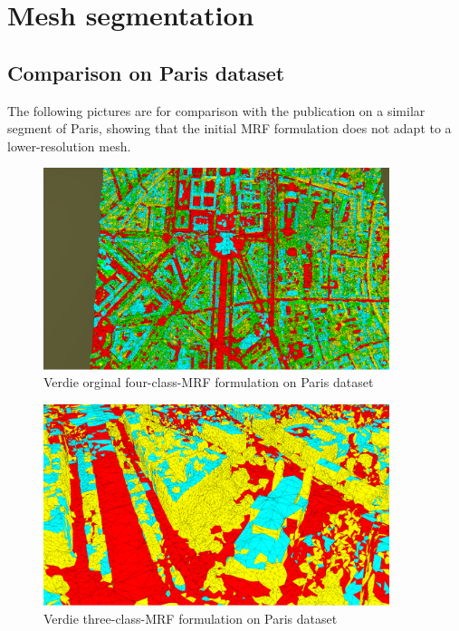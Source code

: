 \documentclass{kththesis}
\begin{document}
\newpage
\section{Mesh segmentation}
\subsection{Comparison on Paris dataset}
The following pictures are for comparison with the \textcite{verdie} publication on a similar segment of Paris, showing that the initial MRF formulation does not adapt to a lower-resolution mesh.
\begin{figure}[H]
    \centering
    \includegraphics[width=0.9\textwidth]{images/MRF_res/paris_4class_verdie.png}
    \caption{Verdie orginal four-class-MRF formulation on Paris dataset}
    \label{fig:paris_verdie_mrf4}
\end{figure}
\begin{figure}[H]
    \centering
    \includegraphics[width=0.9\textwidth]{images/MRF_res/paris_3class_verdie.png}
    \caption{Verdie three-class-MRF formulation on Paris dataset}
    \label{fig:paris_verdie_mrf3}
\end{figure}
\end{document}
